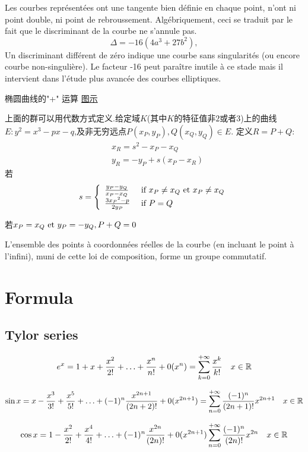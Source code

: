 \documentclass{book}
\begin{document}
Les courbes représentées ont une tangente bien définie en chaque point, n'ont ni point double, ni point de rebroussement.
Algébriquement, ceci se traduit par le fait que le discriminant de la courbe ne s'annule pas.
$$ \Delta = -16(4a^3 + 27b^2), $$
Un discriminant différent de zéro indique une courbe sans singularités (ou encore courbe non-singulière).
Le facteur -16 peut para\^itre inutile à ce stade mais il intervient dans l'étude plus avancée des courbes elliptiques.

椭圆曲线的"+" 运算
\href{http://upload.wikimedia.org/wikipedia/commons/thumb/c/c1/ECClines.svg/680px-ECClines.svg.png}{图示}

上面的群可以用代数方式定义.给定域$K$(其中$K$的特征值非$2$或者$3$)上的曲线$E: y^2 = x^3 - px - q$,及非无穷远点$P(x_P,y_P), Q(x_Q, y_Q) \in E$.
定义$R = P+Q$:
$$
\begin{aligned}
& x_R = s^2 - x_P - x_Q \\
& y_R = -y_P + s(x_P - x_R)
\end{aligned}
$$
若
$$
s =
\left\{
  \begin{array}{ll}
	\frac{y_P - y_Q}{x_P - x_Q} &  \textrm{\ if } x_P \ne x_Q \textrm{\ et } x_P \neq x_Q \\
	\frac{3{x_P}^2 - p}{2y_P} & \textrm{\ if } P = Q
  \end{array}
\right.
$$

若$x_P = x_Q \textrm{\ et } y_P = -y_Q, P+Q = 0$

\begin{theorem}
L'ensemble des points à coordonnées réelles de la courbe (en incluant le point à l'infini), muni de cette loi de composition, forme un groupe commutatif.
\end{theorem}

\chapter{Formula}
\section{Tylor series}
$$
e^x
= 1+x+\frac{ x^2}{2!}
+ \ldots +
\frac{ x^n}{n!}
+0(x^n)
=\sum_{k=0}^{+\infty}\frac{ x^k}{k!}
\quad x \in \mathbb{R}
$$

$$
\sin x=x-\frac{ x^3}{3!}+\frac{ x^5}{5!}+\ldots+ (-1)^n \frac{x^{2n+1}}{(2n+2)!}+
0(x^{2n+1})
=
\sum_{n=0}^{+\infty} \frac{(-1)^n}{(2n+1)!} x^{2n+1}
\quad x \in \mathbb{R}
$$

$$
\cos x =
1 - \frac{ x^2}{2!} + \frac{ x^4}{4!}
+ \ldots +
(-1)^n \frac{ x^{2n}}{(2n)!} + 0(x^{2n+1})
\sum_{n=0}^{+\infty} \frac{(-1)^n}{(2n)!} x^{2n}
\quad x \in \mathbb{R}
$$
\end{document}
